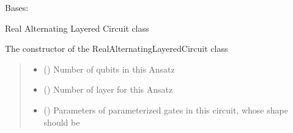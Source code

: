 \documentclass[letterpaper,10pt,english]{sphinxmanual}
\begin{document}
\begin{fulllineitems}
\begin{fulllineitems}
\begin{quote}
\begin{description}
\end{description}\end{quote}

\end{fulllineitems}


\end{fulllineitems}


\begin{fulllineitems}
\label{\detokenize{qcompute_qapp.circuit:qcompute_qapp.circuit.RealAlternatingLayeredCircuit}}
\pysigstartsignatures
{}
\pysigstopsignatures
\sphinxAtStartPar
Bases: {\hyperref[\detokenize{qcompute_qapp.circuit:qcompute_qapp.circuit.ParameterizedCircuit}]{}}

\sphinxAtStartPar
Real Alternating Layered Circuit class

\sphinxAtStartPar
The constructor of the RealAlternatingLayeredCircuit class
\begin{quote}\begin{description}
\begin{itemize}
\item {} 
\sphinxAtStartPar
{} () \textendash{} Number of qubits in this Ansatz

\item {} 
\sphinxAtStartPar
{} () \textendash{} Number of layer for this Ansatz

\item {} 
\sphinxAtStartPar
{} () \textendash{} Parameters of parameterized gates in this circuit, whose shape
should be 


\end{itemize}
\end{description}
\end{quote}
\end{fulllineitems}
\end{document}
